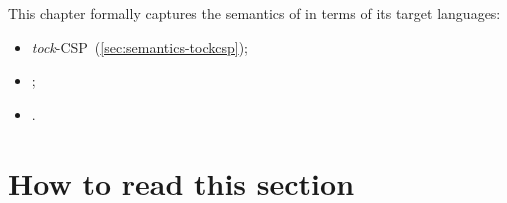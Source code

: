 
\newcommand{\tockcsp}{\emph{tock}-CSP}
\newcommand{\cspm}{CSP\(_\text{M}\)}

\newcommand{\defeq}{\mathbin{\overset{\text{def}}=}}
\newcommand{\interrupt}{\mathbin{\triangle}}
\newcommand{\cspnsop}{\mathbin{\!:\!:\!}}
\newcommand{\cspkw}[1]{\operatorname{\mathbf{#1}}}
\newcommand{\runproc}[1]{\cspkw{Run}\left(#1\right)}
\newcommand{\events}{\cspkw{Events}}
\newcommand{\anarrow}{a}
\newcommand{\anevent}{e}
\newcommand{\agap}{g}
\newcommand{\amsgset}{M}
\newcommand{\aloop}{l}
\newcommand{\anop}{o}
\newcommand{\aseq}{\sigma}
\newcommand{\asseq}{q}
\newcommand{\astep}{s}
\newcommand{\atarget}{t}
\newcommand{\aworld}{w}
\newcommand{\anaction}{x}

\newcommand{\sema}[1]{\llbracket #1 \rrbracket}
\newcommand{\stepsema}[1]{\sema{#1}^{\mathsf{step}}}
\newcommand{\gapsema}[2]{\sema{#1}^{\mathsf{gap}}_{(#2)}}
\newcommand{\actsema}[1]{\sema{#1}^{\mathsf{act}}}
\newcommand{\arrsema}[1]{\sema{#1}^{\mathsf{arr}}}
\newcommand{\loopsema}[1]{\sema{#1}^{\mathsf{loop}}}
\newcommand{\msgsetsema}[1]{\sema{#1}^{\mathsf{mset}}}
\newcommand{\seqsema}[1]{\sema{#1}^{\mathsf{seq}}}
\newcommand{\sseqsema}[1]{\sema{#1}^{\mathsf{sseq}}}

\newcommand{\funcname}[1]{\mathsf{#1}}
\newcommand{\eventsof}[1]{\funcname{events}(#1)}

\newcommand{\field}[2]{#1.\funcname{#2}}

This chapter formally captures the semantics of \langname{} in terms of its
target languages:

\begin{itemize}
\item
	\tockcsp~(\cref{sec:semantics-tockcsp});
\item
	;
\item
	.
\end{itemize}

\section{How to read this section}

